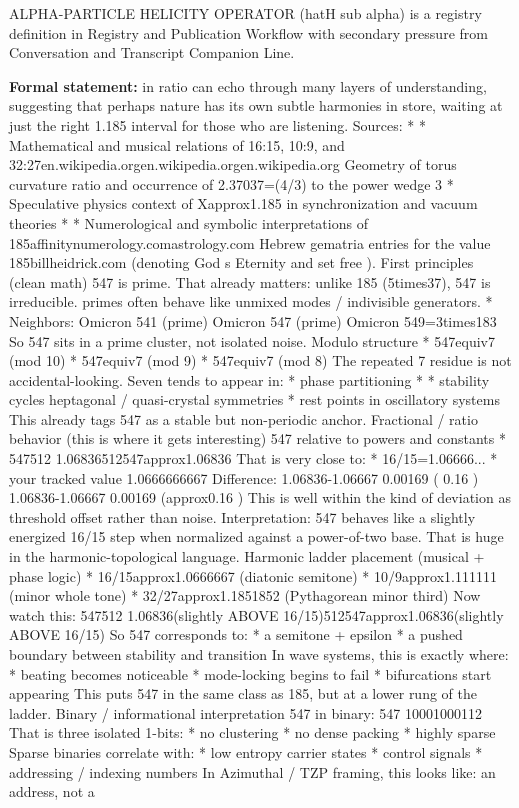 
\begingroup\small
{}
ALPHA-PARTICLE HELICITY OPERATOR (hatH sub alpha) is a registry definition in Registry and Publication Workflow with secondary pressure from Conversation and Transcript Companion Line.

\begingroup\footnotesize\setlength{\emergencystretch}{3em}\sloppy
\textbf{Formal statement:} in ratio can echo through many layers of understanding, suggesting that perhaps nature has its own subtle harmonies in store, waiting at just the right 1.185 interval for those who are listening. Sources: * * Mathematical and musical relations of 16:15, 10:9, and 32:27en.wikipedia.orgen.wikipedia.orgen.wikipedia.org Geometry of torus curvature ratio and occurrence of 2.37037=(4/3) to the power wedge 3 * Speculative physics context of Xapprox1.185 in synchronization and vacuum theories * * Numerological and symbolic interpretations of 185affinitynumerology.comastrology.com Hebrew gematria entries for the value 185billheidrick.com (denoting God s Eternity and set free ). First principles (clean math) 547 is prime. That already matters: unlike 185 (5times37), 547 is irreducible. primes often behave like unmixed modes / indivisible generators. * Neighbors: Omicron 541 (prime) Omicron 547 (prime) Omicron 549=3times183 So 547 sits in a prime cluster, not isolated noise. Modulo structure * 547equiv7 (mod 10) * 547equiv7 (mod 9) * 547equiv7 (mod 8) The repeated 7 residue is not accidental-looking. Seven tends to appear in: * phase partitioning * * stability cycles heptagonal / quasi-crystal symmetries * rest points in oscillatory systems This already tags 547 as a stable but non-periodic anchor. Fractional / ratio behavior (this is where it gets interesting) 547 relative to powers and constants * 547512 1.06836512547approx1.06836 That is very close to: * 16/15=1.06666... * your tracked value 1.0666666667 Difference: 1.06836-1.06667 0.00169 ( 0.16 ) 1.06836-1.06667 0.00169 (approx0.16 ) This is well within the kind of deviation as threshold offset rather than noise. Interpretation: 547 behaves like a slightly energized 16/15 step when normalized against a power-of-two base. That is huge in the harmonic-topological language. Harmonic ladder placement (musical + phase logic) * 16/15approx1.0666667 (diatonic semitone) * 10/9approx1.111111 (minor whole tone) * 32/27approx1.1851852 (Pythagorean minor third) Now watch this: 547512 1.06836(slightly ABOVE 16/15)512547approx1.06836(slightly ABOVE 16/15) So 547 corresponds to: * a semitone + epsilon * a pushed boundary between stability and transition In wave systems, this is exactly where: * beating becomes noticeable * mode-locking begins to fail * bifurcations start appearing This puts 547 in the same class as 185, but at a lower rung of the ladder. Binary / informational interpretation 547 in binary: 547 10001000112 That is three isolated 1-bits: * no clustering * no dense packing * highly sparse Sparse binaries correlate with: * low entropy carrier states * control signals * addressing / indexing numbers In Azimuthal / TZP framing, this looks like: an address, not a 
